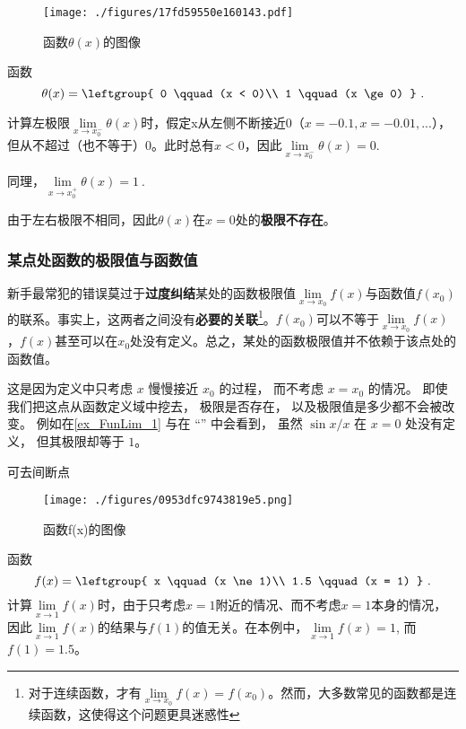 \begin{example}{}
\begin{figure}[ht]
\centering
\texttt{[image: ./figures/17fd59550e160143.pdf]}
\caption{函数$\theta(x)$的图像} \label{fig_FunLim_3}
\end{figure}
函数
\begin{equation}
\theta(x) = \leftgroup{
0 \qquad (x < 0)\\
1 \qquad (x \ge 0)
}~.\end{equation}

计算左极限$\lim\limits_{x\to x_0^-} \theta(x)$时，假定x从左侧不断接近$0$（$x=-0.1,x=-0.01,...$）， 但从不超过（也不等于）$0$。此时总有$x<0$，因此$\lim\limits_{x\to x_0^-} \theta(x) = 0$. 

同理，$\lim\limits_{x\to x_0^+} \theta(x) = 1~.$

由于左右极限不相同，因此$\theta(x)$在$x=0$处的\textbf{极限不存在}。
\end{example}

\subsubsection{某点处函数的极限值与函数值}
新手最常犯的错误莫过于\textbf{过度纠结}某处的函数极限值$\lim\limits_{x\to x_0} f(x)$与函数值$f(x_0)$的联系。事实上，这两者之间没有\textbf{必要的关联}\footnote{对于连续函数，才有$\lim\limits_{x\to x_0} f(x)=f(x_0)$。然而，大多数常见的函数都是连续函数，这使得这个问题更具迷惑性}。$f(x_0)$可以不等于$\lim\limits_{x\to x_0} f(x)$，$f(x)$甚至可以在$x_0$处没有定义。总之，某处的函数极限值并不依赖于该点处的函数值。

这是因为定义中只考虑 $x$ 慢慢接近 $x_0$ 的过程， 而不考虑 $x = x_0$ 的情况。 即使我们把这点从函数定义域中挖去， 极限是否存在， 以及极限值是多少都不会被改变。 例如在\autoref{ex_FunLim_1} 与在 “” 中会看到， 虽然 $\sin x/ x$ 在 $x = 0$ 处没有定义， 但其极限却等于 $1$。

\begin{example}{可去间断点}
\begin{figure}[ht]
\centering
\texttt{[image: ./figures/0953dfc9743819e5.png]}
\caption{函数f(x)的图像} \label{fig_FunLim_4}
\end{figure}
函数
\begin{equation}
f(x) = \leftgroup{
x \qquad (x \ne 1)\\
1.5 \qquad (x = 1)
}~.\end{equation}
计算$\lim\limits_{x\to 1} f(x)$时，由于只考虑$x=1$附近的情况、而不考虑$x=1$本身的情况，因此$\lim\limits_{x\to 1} f(x)$的结果与$f(1)$的值无关。在本例中，$\lim\limits_{x\to 1} f(x)=1$, 而$f(1)=1.5$。
\end{example}


